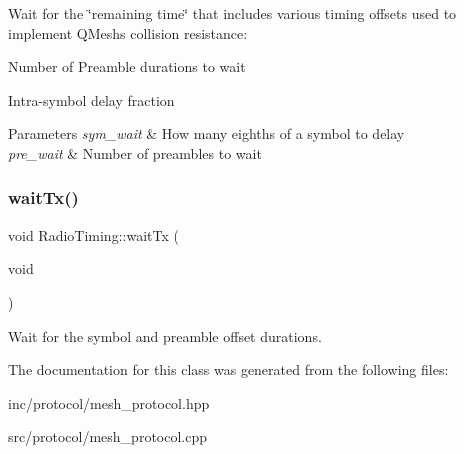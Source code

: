 Wait for the \char`\"{}remaining time\char`\"{} that includes various timing offsets used to implement Q\+Mesh\textquotesingle{}s collision resistance\+:
\begin{DoxyItemize}
\item Number of Preamble durations to wait
\item Intra-\/symbol delay fraction 
\begin{DoxyParams}{Parameters}
{\em sym\+\_\+wait} & How many eighths of a symbol to delay \\
\hline
{\em pre\+\_\+wait} & Number of preambles to wait \\
\hline
\end{DoxyParams}

\end{DoxyItemize}\mbox{\label{classRadioTiming_a8451969371826cd733288652f5323053}} 
\subsubsection{\texorpdfstring{wait\+Tx()}{waitTx()}}
{\footnotesize\ttfamily void Radio\+Timing\+::wait\+Tx (\begin{DoxyParamCaption}\item[{void}]{ }\end{DoxyParamCaption})}

Wait for the symbol and preamble offset durations. 

The documentation for this class was generated from the following files\+:\begin{DoxyCompactItemize}
\item 
inc/protocol/mesh\+\_\+protocol.\+hpp\item 
src/protocol/mesh\+\_\+protocol.\+cpp\end{DoxyCompactItemize}
